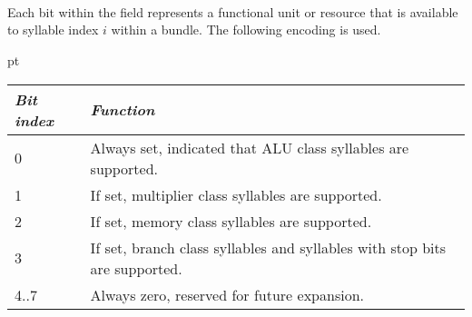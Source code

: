 \  %

\implementation{}

\  %

\implementation{}

\  %

\implementation{}


Each bit within the field represents a functional unit or resource that is
available to syllable index $i$ within a bundle. The following encoding is used.

 pt\noindent\begin{tabular}{|l|p{12cm}|}
\hline
\emph{Bit index} & \emph{Function} \\
\hline
0 & Always set, indicated that ALU class syllables are supported. \\
\hline
1 & If set, multiplier class syllables are supported. \\
\hline
2 & If set, memory class syllables are supported. \\
\hline
3 & If set, branch class syllables and syllables with stop bits are supported. \\
\hline
4..7 & Always zero, reserved for future expansion. \\
\hline
\end{tabular}


